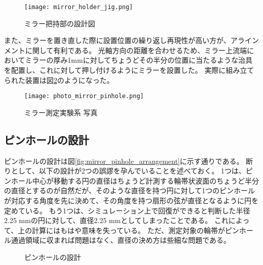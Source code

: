\begin{figure}[!ht]
\centering
\texttt{[image: mirror\_holder\_jig.png]}
\caption{ミラー把持部の設計図}
\label{fig:mirror_holder_jig}
\end{figure}

また、ミラーを置き直した際に設置位置の繰り返し再現性が高い方が、アラインメントに関して有利である。
光軸方向の距離を合わせるため、ミラー上流端においてミラーの厚み1mmに対してちょうどその半分の位置に当たるような治具を配置し、これに対して押し付けるようにミラーを設置した。
実際に組み立てられた装置は図\ref{fig:photo_mirror_experiment_mirror_and_pinhole}のようになった。

\begin{figure}[!ht]
\centering
\texttt{[image: photo\_mirror\_pinhole.png]}
\caption{ミラー測定実験系 写真}
\label{fig:photo_mirror_experiment_mirror_and_pinhole}
\end{figure}


\subsection{ピンホールの設計}

ピンホールの設計は図\ref{fig:mirror_pinhole_arrangement}に示す通りである。
断りとして、以下の設計が2つの誤謬を孕んでいることを述べておく。
1つは、ピンホール中心が移動する円の直径はちょうど計測する輪帯状波面のちょうど半分の直径とするのが自然だが、そのような直径を持つ円に対して1つのピンホールが対応する角度を先に決めて、その角度を持つ扇形の弦が直径となるように円を定めている。
もう1つは、シミュレーション上で回復ができると判断した半径2.25 mmの円に対して、直径2.25 mmとしてしまったことである。
これによって、上の計算にはもはや意味を失っている。
ただ、測定対象の輪帯がピンホール通過領域に収まれば問題はなく、直径の決め方は些細な問題である。

\begin{figure}[!ht]
\centering

\caption[]{ピンホールの設計}
\label{fig:pinhole_arrangement_pictures}
\end{figure}



\clearpage
\newpage

